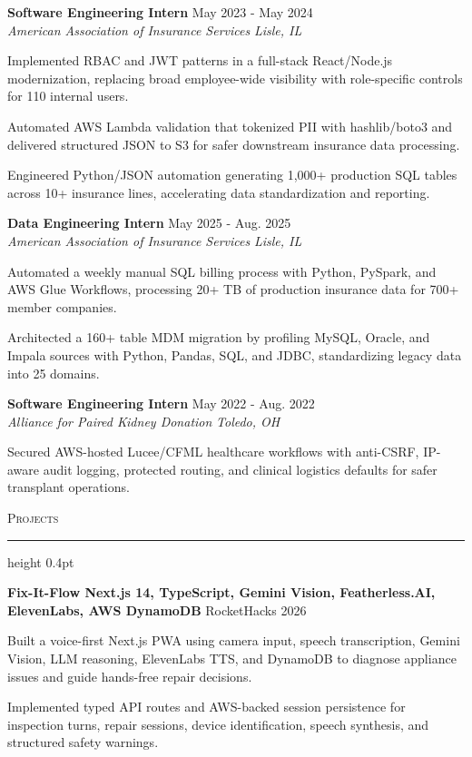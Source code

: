 \documentclass[letterpaper,11pt]{article}
\newcommand{\resumesection}[1]{%
  \par\vspace{2pt}%
  {\large\scshape #1}\par\vspace{2pt}%
  \hrule height 0.4pt\vspace{2pt}%
}
\newcommand{\resumeSubheading}[4]{
  \textbf{#1} \hfill #2\\
  \textit{#3} \hfill \textit{#4}
}
\newcommand{\projectHeading}[2]{
  \textbf{#1} \hfill #2
}
\begin{document}
\resumeSubheading
{Software Engineering Intern}{May 2023 - May 2024}
{American Association of Insurance Services}{Lisle, IL}
\begin{tightitemize}
  \item Implemented RBAC and JWT patterns in a full-stack React/Node.js modernization, replacing broad employee-wide visibility with role-specific controls for 110 internal users.
  \item Automated AWS Lambda validation that tokenized PII with hashlib/boto3 and delivered structured JSON to S3 for safer downstream insurance data processing.
  \item Engineered Python/JSON automation generating 1,000+ production SQL tables across 10+ insurance lines, accelerating data standardization and reporting.
\end{tightitemize}

\resumeSubheading
{Data Engineering Intern}{May 2025 - Aug. 2025}
{American Association of Insurance Services}{Lisle, IL}
\begin{tightitemize}
  \item Automated a weekly manual SQL billing process with Python, PySpark, and AWS Glue Workflows, processing 20+ TB of production insurance data for 700+ member companies.
  \item Architected a 160+ table MDM migration by profiling MySQL, Oracle, and Impala sources with Python, Pandas, SQL, and JDBC, standardizing legacy data into 25 domains.
\end{tightitemize}

\resumeSubheading
{Software Engineering Intern}{May 2022 - Aug. 2022}
{Alliance for Paired Kidney Donation}{Toledo, OH}
\begin{tightitemize}
  \item Secured AWS-hosted Lucee/CFML healthcare workflows with anti-CSRF, IP-aware audit logging, protected routing, and clinical logistics defaults for safer transplant operations.
\end{tightitemize}

\resumesection{Projects}
\projectHeading{Fix-It-Flow \textbar{} Next.js 14, TypeScript, Gemini Vision, Featherless.AI, ElevenLabs, AWS DynamoDB}{RocketHacks 2026}
\begin{tightitemize}
  \item Built a voice-first Next.js PWA using camera input, speech transcription, Gemini Vision, LLM reasoning, ElevenLabs TTS, and DynamoDB to diagnose appliance issues and guide hands-free repair decisions.
  \item Implemented typed API routes and AWS-backed session persistence for inspection turns, repair sessions, device identification, speech synthesis, and structured safety warnings.
\end{tightitemize}
\end{document}

